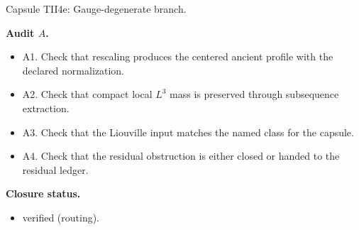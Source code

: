 \documentclass[11pt]{amsart}
\newcommand{\capsulefield}[1]{\par\smallskip\noindent\textbf{#1.}\ }
\begin{document}
\begin{proofcapsule}{Capsule TII4e: Gauge-degenerate branch.}
  \capsulefield{Audit \(A\)}
  \begin{itemize}[leftmargin=1.8em]
  \item A1. Check that rescaling produces the centered ancient profile with the declared normalization.
  \item A2. Check that compact local $L^3$ mass is preserved through subsequence extraction.
  \item A3. Check that the Liouville input matches the named class for the capsule.
  \item A4. Check that the residual obstruction is either closed or handed to the residual ledger.
  \end{itemize}
  \capsulefield{Closure status}
  \begin{itemize}[leftmargin=1.8em]
  \item verified (routing).
  \end{itemize}
\end{proofcapsule}
\end{document}
